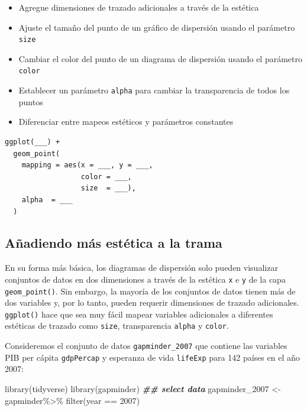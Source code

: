 \documentclass[
]{book}
\newenvironment{Shaded}{\begin{snugshade}}{\end{snugshade}}
\newcommand{\DecValTok}[1]{\textcolor[rgb]{0.00,0.00,0.81}{#1}}
\newcommand{\DocumentationTok}[1]{\textcolor[rgb]{0.56,0.35,0.01}{\textbf{\textit{#1}}}}
\newcommand{\FunctionTok}[1]{\textcolor[rgb]{0.00,0.00,0.00}{#1}}
\newcommand{\NormalTok}[1]{#1}
\newcommand{\OtherTok}[1]{\textcolor[rgb]{0.56,0.35,0.01}{#1}}
\newcommand{\SpecialCharTok}[1]{\textcolor[rgb]{0.00,0.00,0.00}{#1}}
\providecommand{\tightlist}{%
  \setlength{\itemsep}{0pt}\setlength{\parskip}{0pt}}
\begin{document}
\begin{itemize}
\tightlist
\item
  Agregue dimensiones de trazado adicionales a través de la estética
\item
  Ajuste el tamaño del punto de un gráfico de dispersión usando el parámetro \texttt{size}
\item
  Cambiar el color del punto de un diagrama de dispersión usando el parámetro \texttt{color}
\item
  Establecer un parámetro \texttt{alpha} para cambiar la transparencia de todos los puntos
\item
  Diferenciar entre mapeos estéticos y parámetros constantes
\end{itemize}

\begin{verbatim}
ggplot(___) + 
  geom_point(
    mapping = aes(x = ___, y = ___, 
                  color = ___, 
                  size  = ___),
    alpha  = ___
  )
\end{verbatim}

\hypertarget{auxf1adiendo-muxe1s-estuxe9tica-a-la-trama}{%
\subsection{Añadiendo más estética a la trama}\label{auxf1adiendo-muxe1s-estuxe9tica-a-la-trama}}

En su forma más básica, los diagramas de dispersión solo pueden visualizar conjuntos de datos en dos dimensiones a través de la estética \texttt{x} e \texttt{y} de la capa \texttt{geom\_point()}. Sin embargo, la mayoría de los conjuntos de datos tienen más de dos variables y, por lo tanto, pueden requerir dimensiones de trazado adicionales. \texttt{ggplot()} hace que sea muy fácil mapear variables adicionales a diferentes estéticas de trazado como \texttt{size}, transparencia \texttt{alpha} y \texttt{color}.

Consideremos el conjunto de datos \texttt{gapminder\_2007} que contiene las variables PIB per cápita \texttt{gdpPercap} y esperanza de vida \texttt{lifeExp} para 142 países en el año 2007:

\begin{Shaded}
\begin{Highlighting}[]
\FunctionTok{library}\NormalTok{(tidyverse)}
\FunctionTok{library}\NormalTok{(gapminder)}
\DocumentationTok{\#\# select data}
\NormalTok{gapminder\_2007 }\OtherTok{\textless{}{-}}\NormalTok{ gapminder}\SpecialCharTok{\%\textgreater{}\%}
  \FunctionTok{filter}\NormalTok{(year }\SpecialCharTok{==} \DecValTok{2007}\NormalTok{)}
\end{Highlighting}
\end{Shaded}
\end{document}
